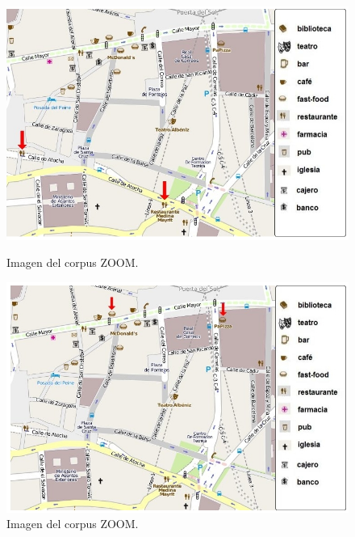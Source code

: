 \begin{figure}
\begin{minipage}[b]{0.5\linewidth}
\centering
\includegraphics[width=\textwidth]{images/corpus/mapa11.png}
\caption{Imagen del corpus ZOOM.}
\label{mapa11}
\end{minipage}
\hspace*{0cm}
\begin{minipage}[b]{0.5\linewidth}
\centering
\includegraphics[width=\textwidth]{images/corpus/mapa12.png}
\caption{Imagen del corpus ZOOM.}
\label{mapa12}
\end{minipage}
\end{figure}

